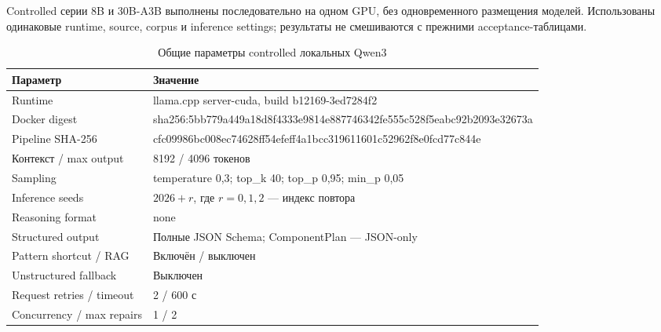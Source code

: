 Controlled серии 8B и 30B-A3B выполнены последовательно на одном GPU, без одновременного размещения моделей. Использованы одинаковые runtime, source, corpus и inference settings; результаты не смешиваются с прежними acceptance-таблицами.

\begin{table}[H]
    \centering
    \caption{Общие параметры controlled локальных Qwen3}
    \label{tab:controlled-llama-config}
    \small
    \begin{tabularx}{\textwidth}{L{5cm}X}
        \toprule
        Параметр & Значение \\
        \midrule
        Runtime & llama.cpp server-cuda, build b12169-3ed7284f2 \\
        Docker digest & {\scriptsize\ttfamily sha256:5bb779a449a18d8f\allowbreak 4333e9814e88774634\allowbreak 2fe555c528f5eabc92b2\allowbreak 093e32673a} \\
        Pipeline SHA-256 & {\scriptsize\ttfamily cfc09986bc008ec746\allowbreak 28ff54efeff4a1bcc3\allowbreak 19611601c52962f8e0fcd\allowbreak 77c844e} \\
        Контекст / max output & 8192 / 4096 токенов \\
        Sampling & temperature 0,3; top\_k 40; top\_p 0,95; min\_p 0,05 \\
        Inference seeds & $2026+r$, где $r=0,1,2$ --- индекс повтора \\
        Reasoning format & none \\
        Structured output & Полные JSON Schema; ComponentPlan --- JSON-only \\
        Pattern shortcut / RAG & Включён / выключен \\
        Unstructured fallback & Выключен \\
        Request retries / timeout & 2 / 600 с \\
        Concurrency / max repairs & 1 / 2 \\
        \bottomrule
    \end{tabularx}
\end{table}

